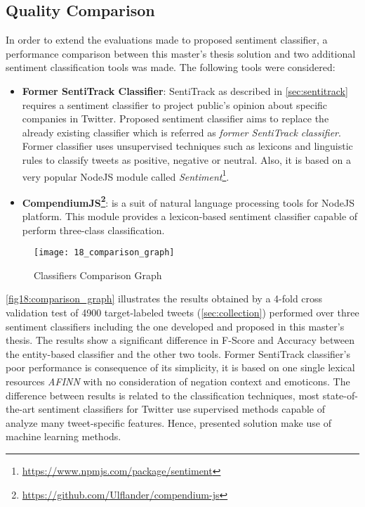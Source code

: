 \subsection{Quality Comparison}

In order to extend the evaluations made to proposed sentiment classifier, a performance comparison between this master's thesis solution and two additional sentiment classification tools was made. The following tools were considered: 

\begin{itemize} 
\itemsep0em  

\item \textbf{Former SentiTrack Classifier}: SentiTrack as described in \autoref{sec:sentitrack} requires a sentiment classifier to project public's opinion about specific companies in Twitter. Proposed sentiment classifier aims to replace the already existing classifier which is referred as \textit{former SentiTrack classifier}. Former classifier uses unsupervised techniques such as lexicons and linguistic rules to classify tweets as positive, negative or neutral. Also, it is based on a very popular NodeJS module called \textit{Sentiment}\footnote{\url{https://www.npmjs.com/package/sentiment}}. 

\item \textbf{CompendiumJS\footnote{\url{https://github.com/Ulflander/compendium-js}}}: is a suit of natural language processing tools for NodeJS platform. This module provides a lexicon-based sentiment classifier capable of perform three-class classification. 

\end{itemize}

\begin{figure}[H]
    \centering
    \caption[Classifiers Comparison Graph]{Classifiers Comparison Graph}
    \texttt{[image: 18\_comparison\_graph]}
    \label{fig18:comparison_graph}
\end{figure}

\autoref{fig18:comparison_graph} illustrates the results obtained by a 4-fold cross validation test of 4900  target-labeled tweets (\autoref{sec:collection}) performed over three sentiment classifiers including the one developed and proposed in this master's thesis. The results show a significant difference in F-Score and Accuracy between the entity-based classifier and the other two tools. Former SentiTrack classifier's poor performance is consequence of its simplicity, it is based on one single lexical resources \textit{AFINN} with no consideration of negation context and emoticons. The difference between results is related to the classification techniques, most state-of-the-art sentiment classifiers for Twitter use supervised methods capable of analyze many tweet-specific features. Hence, presented solution make use of machine learning methods.  


